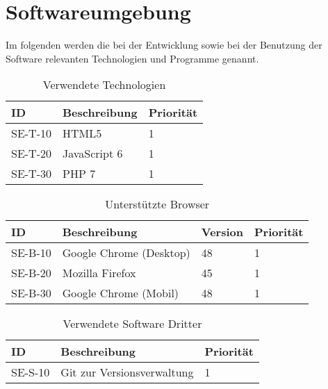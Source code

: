 
\chapter{Softwareumgebung}
Im folgenden werden die bei der Entwicklung sowie bei der Benutzung der Software relevanten Technologien und Programme genannt.

\begin{table}[H]
\caption{Verwendete Technologien}
\label{softwareumgebung:technologien}
\begin{tabularx}{\textwidth}{|l|X|l|}
\toprule
\textbf{ID} & \textbf{Beschreibung} & \textbf{Priorität}\\
\endhead
\hline
SE-T-10 & HTML5 & 1 \\
SE-T-20 & JavaScript 6 & 1 \\
SE-T-30 & PHP 7 & 1\\
\hline
\end{tabularx}
\end{table}

\begin{table}[H]
\caption{Unterstützte Browser}
\label{softwareumgebung:browser}
\begin{tabularx}{\textwidth}{|l|l|l|l|}
\toprule
\textbf{ID} & \textbf{Beschreibung} & \textbf{Version} & \textbf{Priorität}\\
\endhead
\hline
SE-B-10 & Google Chrome (Desktop) & 48 & 1 \\
SE-B-20 & Mozilla Firefox & 45 & 1 \\
SE-B-30 & Google Chrome (Mobil) & 48 & 1\\
\hline
\end{tabularx}
\end{table}

\begin{table}[H]
\caption{Verwendete Software Dritter}
\label{softwareumgebung:sonstige}
\begin{tabularx}{\textwidth}{|l|X|l|}
\toprule
\textbf{ID} & \textbf{Beschreibung} & \textbf{Priorität}\\
\endhead
\hline
SE-S-10 & Git zur Versionsverwaltung & 1 \\
\hline
\end{tabularx}
\end{table}
